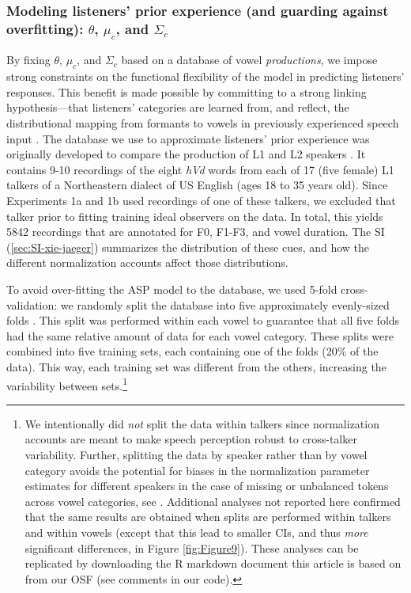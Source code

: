 \documentclass[preprint]{JASA}
\begin{document}
\subsubsection{\texorpdfstring{Modeling listeners' prior experience (and guarding against overfitting): \(\theta\), \(\mu_c\), and \(\Sigma_c\)}{Modeling listeners' prior experience (and guarding against overfitting): \textbackslash theta, \textbackslash mu\_c, and \textbackslash Sigma\_c}}\label{modeling-listeners-prior-experience-and-guarding-against-overfitting-theta-mu_c-and-sigma_c}

By fixing \(\theta\), \(\mu_c\), and \(\Sigma_c\) based on a database of vowel \emph{productions}, we impose strong constraints on the functional flexibility of the model in predicting listeners' responses. This benefit is made possible by committing to a strong linking hypothesis---that listeners' categories are learned from, and reflect, the distributional mapping from formants to vowels in previously experienced speech input \citep[e.g.,][]{abramson-lisker1973, massaro-friedman1990, nearey-hogan1986}. The database we use to approximate listeners' prior experience was originally developed to compare the production of L1 and L2 speakers \citep{xie-jaeger2020}. It contains 9-10 recordings of the eight \emph{hVd} words from each of 17 (five female) L1 talkers of a Northeastern dialect of US English (ages 18 to 35 years old). Since Experiments 1a and 1b used recordings of one of these talkers, we excluded that talker prior to fitting training ideal observers on the data. In total, this yields 5842 recordings that are annotated for F0, F1-F3, and vowel duration. The SI (\ref{sec:SI-xie-jaeger}) summarizes the distribution of these cues, and how the different normalization accounts affect those distributions.

To avoid over-fitting the ASP model to the database, we used 5-fold cross-validation: we randomly split the \citet{xie-jaeger2020} database into five approximately evenly-sized folds \citep[following][]{persson-jaeger2023}. This split was performed within each vowel to guarantee that all five folds had the same relative amount of data for each vowel category. These splits were combined into five training sets, each containing one of the folds (20\% of the data). This way, each training set was different from the others, increasing the variability between sets.\footnote{We intentionally did \emph{not} split the data within talkers since normalization accounts are meant to make speech perception robust to cross-talker variability. Further, splitting the data by speaker rather than by vowel category avoids the potential for biases in the normalization parameter estimates for different speakers in the case of missing or unbalanced tokens across vowel categories, see \citep{barreda-nearey2018}. Additional analyses not reported here confirmed that the same results are obtained when splits are performed within talkers and within vowels (except that this lead to smaller CIs, and thus \emph{more} significant differences, in Figure \ref{fig:Figure9}). These analyses can be replicated by downloading the R markdown document this article is based on from our OSF (see comments in our code).}
\end{document}
